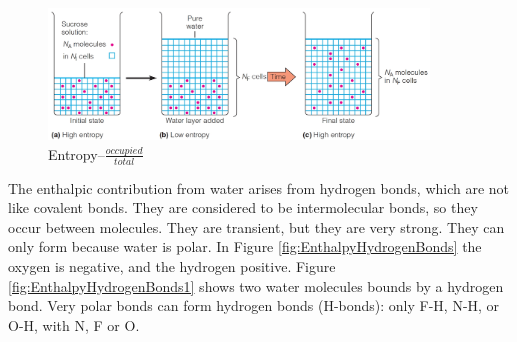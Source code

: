 \documentclass[]{article}
\begin{document}
\begin{figure}[H]
	\caption{Entropy--$\frac{occupied}{total}$} \label{fig:EntropySugar} 
	\includegraphics[width=0.9\textwidth]{EntropySugar}
\end{figure}

The enthalpic contribution from water arises from hydrogen bonds, which are not like covalent bonds. They are considered to be intermolecular bonds, so they occur between molecules. They are transient, but they are very strong. They can only form because water is polar. In Figure \ref{fig:EnthalpyHydrogenBonds} the oxygen is negative, and the hydrogen positive. Figure \ref{fig:EnthalpyHydrogenBonds1} shows two water molecules bounds by a hydrogen bond. Very polar bonds can form hydrogen bonds (H-bonds): only F-H, N-H, or O-H, with
N, F or O.
\end{document}
